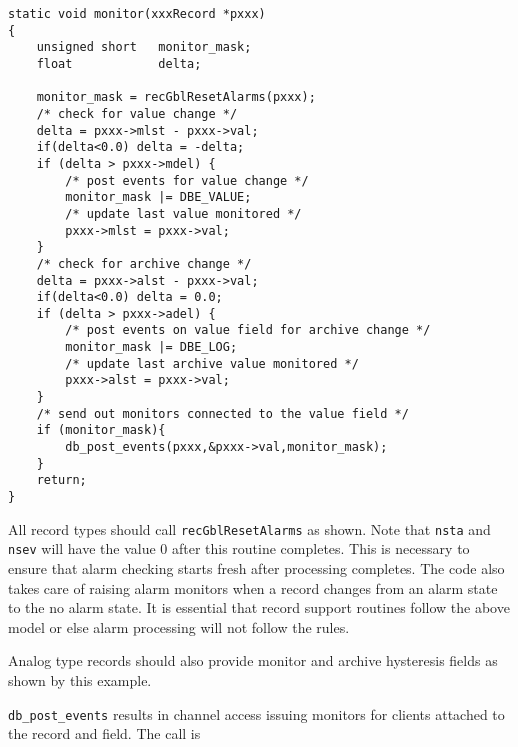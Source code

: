 \begin{verbatim}static void monitor(xxxRecord *pxxx)
{
    unsigned short   monitor_mask;
    float            delta;

    monitor_mask = recGblResetAlarms(pxxx);
    /* check for value change */
    delta = pxxx->mlst - pxxx->val;
    if(delta<0.0) delta = -delta;
    if (delta > pxxx->mdel) {
        /* post events for value change */
        monitor_mask |= DBE_VALUE;
        /* update last value monitored */
        pxxx->mlst = pxxx->val;
    }
    /* check for archive change */
    delta = pxxx->alst - pxxx->val;
    if(delta<0.0) delta = 0.0;
    if (delta > pxxx->adel) {
        /* post events on value field for archive change */
        monitor_mask |= DBE_LOG;
        /* update last archive value monitored */
        pxxx->alst = pxxx->val;
    }
    /* send out monitors connected to the value field */
    if (monitor_mask){
        db_post_events(pxxx,&pxxx->val,monitor_mask);
    }
    return;
}
\end{verbatim}All record types should call \verb|recGblResetAlarms| as shown. Note that \verb|nsta| and \verb|nsev| will have the value 0 after this 
routine completes. This is necessary to ensure that alarm checking starts fresh after processing completes. The code also 
takes care of raising alarm monitors when a record changes from an alarm state to the no alarm state. It is essential that 
record support routines follow the above model or else alarm processing will not follow the rules.

Analog type records should also provide monitor and archive hysteresis fields as shown by this example.

\verb|db_post_events| results in channel access issuing monitors for clients attached to the record and field. The call is

